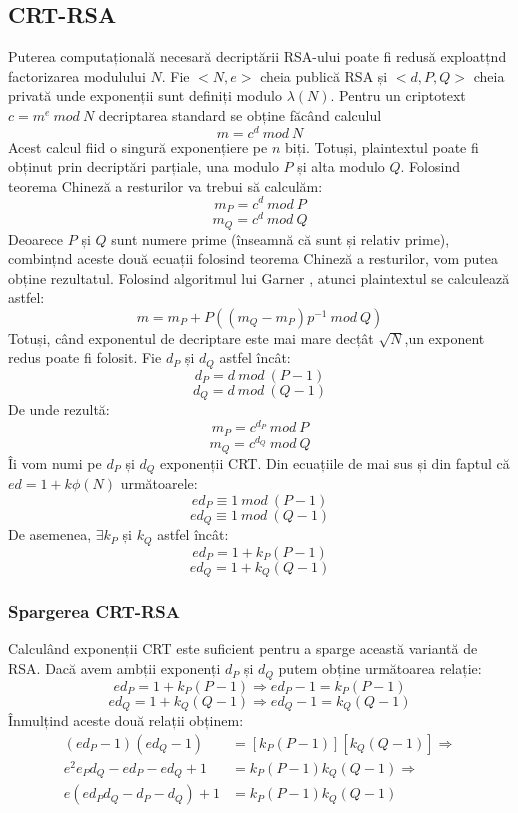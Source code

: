 \documentclass[12]{report}
\begin{document}
\subsection{CRT-RSA}
Puterea computațională necesară decriptării RSA-ului poate fi redusă exploatțnd factorizarea modulului $N$. Fie $<N,e>$ cheia publică RSA și $<d,P,Q>$ cheia privată unde exponenții sunt definiți modulo $\lambda(N)$. Pentru un criptotext $c=m^e \ mod \ N$ decriptarea standard se obține făcând calculul
$$ m=c^d \ mod \ N$$
Acest calcul fiid o singură exponențiere pe $n$ biți. Totuși, plaintextul poate fi obținut prin decriptări parțiale, una modulo $P$ și alta modulo $Q$. Folosind teorema Chineză a resturilor  va trebui să calculăm:
$$ m_P = c^d \ mod \ P$$
$$ m_Q = c^d \ mod \ Q$$
Deoarece $P$ și $Q$ sunt numere prime (înseamnă că sunt și relativ prime), combințnd aceste două ecuații folosind teorema Chineză a resturilor, vom putea obține rezultatul. Folosind algoritmul lui Garner \cite{garner}, atunci plaintextul se calculează astfel:
$$ m=m_P+P((m_Q-m_P)p^{-1} \ mod \ Q)$$
Totuși, când exponentul de decriptare este mai mare decțât $\sqrt{N}$,un exponent redus poate fi folosit. Fie $d_P$ și $d_Q$ astfel încât:
$$ d_P = d \ mod \ (P-1) $$
$$ d_Q = d \ mod \ (Q-1) $$
De unde rezultă:
$$ m_P = c^{d_P} \ mod \ P $$
$$ m_Q = c^{d_Q} \ mod \ Q $$
Îi vom numi pe $ d_P $ și $d_Q$ exponenții CRT. Din ecuațiile de mai sus și din faptul că $ed = 1+ k\phi(N)$ următoarele:
$$ ed_P \equiv 1 \ mod \ (P-1)$$
$$ ed_Q \equiv 1 \ mod \ (Q-1)$$
De asemenea, $\exists k_P$ și $k_Q$ astfel încât:
$$ ed_P = 1 + k_P(P-1)$$
$$ ed_Q = 1+ k_Q(Q-1)$$
\subsubsection{Spargerea CRT-RSA}
Calculând exponenții CRT este suficient pentru a sparge această variantă de RSA. Dacă avem ambții exponenți $d_P$ și $d_Q$ putem obține următoarea relație:
$$ed_P = 1 + k_P(P-1) \Rightarrow ed_P -1 = k_P(P-1)$$
$$ed_Q = 1 + k_Q(Q-1) \Rightarrow ed_Q -1 =k_Q(Q-1)$$
Înmulțind aceste două relații obținem:
\begin{align*}
 (ed_P -1 ) (ed_Q -1) &= [k_P(P-1)][k_Q(Q-1)] \Rightarrow \\ 
 e^2e_Pd_Q - ed_P - ed_Q +1 &= k_P(P-1)k_Q(Q-1) \Rightarrow \\
 e(ed_Pd_Q - d_P -d_Q)+1 &= k_P(P-1)k_Q(Q-1)
\end{align*}
\end{document}
